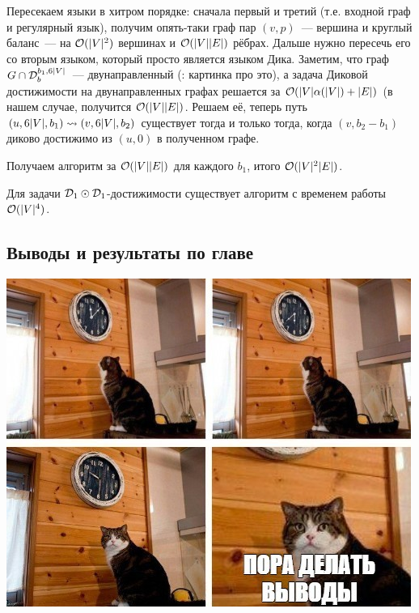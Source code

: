 \begin{enumerate}
    Пересекаем языки в хитром порядке: сначала первый и третий (т.е. входной граф и регулярный язык), получим опять-таки граф пар $(v, p)$~--- вершина и круглый баланс~--- на $\mathcal{O}(|V|^2)$ вершинах и $\mathcal{O}(|V||E|)$ рёбрах. Дальше нужно пересечь его со вторым языком, который просто является языком Дика. Заметим, что граф $G \cap \mathcal{D}_b^{b_1, 6|V|}$~--- двунаправленный (\TODO: картинка про это), а задача Диковой достижимости на двунаправленных графах решается за $\mathcal{O}(|V| \alpha(|V|) + |E|)$ (в нашем случае, получится $\mathcal{O}(|V||E|)$. Решаем её, теперь путь $(u, 6|V|, b_1) \rightsquigarrow (v, 6|V|, b_2)$ существует тогда и только тогда, когда $(v, b_2 - b_1)$ диково достижимо из $(u, 0)$ в полученном графе.

    Получаем алгоритм за $\mathcal{O}(|V||E|)$ для каждого $b_1$, итого $\mathcal{O}(|V|^2 |E|)$.






\end{enumerate}

\begin{theorem}
  Для задачи $\mathcal{D}_1 \odot \mathcal{D}_1$-достижимости существует алгоритм с временем работы $\mathcal{O}(|V|^4)$.
\end{theorem}

\subsection{Выводы и результаты по главе}

\includegraphics[width=0.75\linewidth]{img/conclusion_cat}

\TODO{}